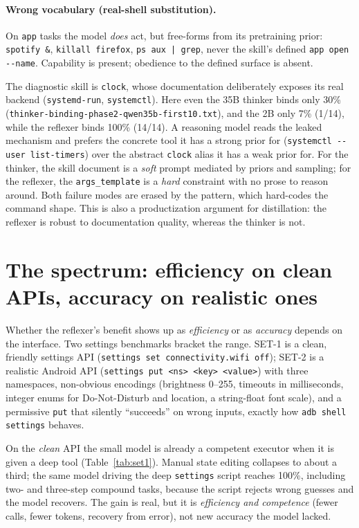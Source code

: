 \paragraph{Wrong vocabulary (real-shell substitution).} On \texttt{app} tasks the
model \emph{does} act, but free-forms from its pretraining prior: \texttt{spotify
\&}, \texttt{killall firefox}, \texttt{ps aux | grep}, never the skill's defined
\texttt{app open -{}-name}. Capability is present; obedience to the defined
surface is absent.

The diagnostic skill is \texttt{clock}, whose documentation deliberately exposes
its real backend (\texttt{systemd-run}, \texttt{systemctl}). Here even the 35B
thinker binds only 30\% (\texttt{thinker-binding-phase2-qwen35b-first10.txt}),
and the 2B only 7\% (1/14), while the reflexer binds 100\% (14/14). A reasoning
model reads the leaked mechanism and prefers the concrete tool it has a strong
prior for (\texttt{systemctl -{}-user list-timers}) over the abstract
\texttt{clock} alias it has a weak prior for. For the thinker, the skill document
is a \emph{soft} prompt mediated by priors and sampling; for the reflexer, the
\texttt{args\_template} is a \emph{hard} constraint with no prose to reason
around. Both failure modes are erased by the pattern, which hard-codes the
command shape. This is also a productization argument for distillation: the
reflexer is robust to documentation quality, whereas the thinker is not.

\section{The spectrum: efficiency on clean APIs, accuracy on realistic ones}
\label{sec:p3}

Whether the reflexer's benefit shows up as \emph{efficiency} or as \emph{accuracy}
depends on the interface. Two settings benchmarks bracket the range. SET-1 is a
clean, friendly settings API (\texttt{settings set connectivity.wifi off}); SET-2
is a realistic Android API (\texttt{settings put <ns> <key> <value>}) with three
namespaces, non-obvious encodings (brightness 0--255, timeouts in milliseconds,
integer enums for Do-Not-Disturb and location, a string-float font scale), and a
permissive \texttt{put} that silently ``succeeds'' on wrong inputs, exactly how
\texttt{adb shell settings} behaves.

On the \emph{clean} API the small model is already a competent executor when it
is given a deep tool (Table~\ref{tab:set1}). Manual state editing collapses to
about a third; the same model driving the deep \texttt{settings} script reaches
100\%, including two- and three-step compound tasks, because the script rejects
wrong guesses and the model recovers. The gain is real, but it is
\emph{efficiency and competence} (fewer calls, fewer tokens, recovery from
error), not new accuracy the model lacked.

